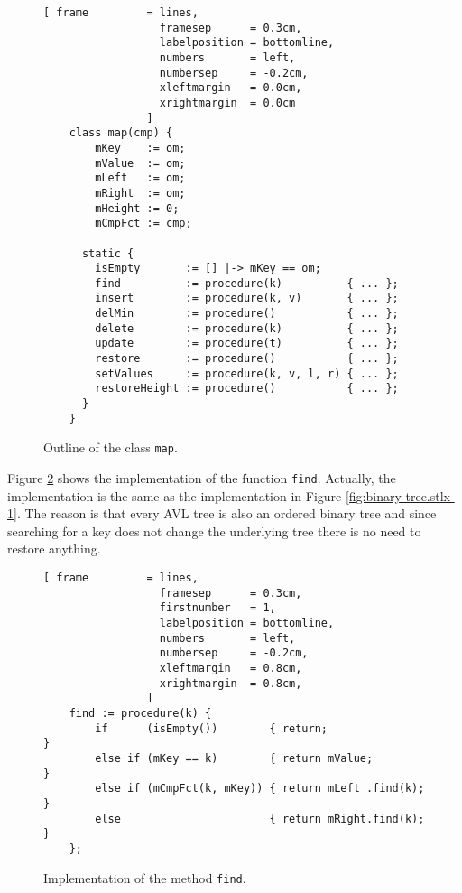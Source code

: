 \begin{figure}[!ht]
  \centering
\begin{Verbatim}[ frame         = lines, 
                  framesep      = 0.3cm, 
                  labelposition = bottomline,
                  numbers       = left,
                  numbersep     = -0.2cm,
                  xleftmargin   = 0.0cm,
                  xrightmargin  = 0.0cm
                ]
    class map(cmp) {
        mKey    := om;
        mValue  := om; 
        mLeft   := om;
        mRight  := om;
        mHeight := 0;
        mCmpFct := cmp;  
    
      static {
        isEmpty       := [] |-> mKey == om;
        find          := procedure(k)          { ... };
        insert        := procedure(k, v)       { ... };
        delMin        := procedure()           { ... };
        delete        := procedure(k)          { ... };
        update        := procedure(t)          { ... };
        restore       := procedure()           { ... };
        setValues     := procedure(k, v, l, r) { ... };
        restoreHeight := procedure()           { ... };
      }
    }
\end{Verbatim}
\vspace*{-0.3cm}
  \caption{Outline of the class \texttt{map}.}
  \label{fig:avl-tree.stlx:outline}
\end{figure}


Figure \ref{fig:avl-tree.stlx:find} shows the implementation of the function \texttt{find}.
Actually, the implementation is the same as the implementation in Figure
\ref{fig:binary-tree.stlx-1}.  The reason is that every AVL tree is also an ordered binary tree and
since searching for a key does not change the underlying tree there is no need to restore anything.

\begin{figure}[!ht]
\centering
\begin{Verbatim}[ frame         = lines, 
                  framesep      = 0.3cm, 
                  firstnumber   = 1,
                  labelposition = bottomline,
                  numbers       = left,
                  numbersep     = -0.2cm,
                  xleftmargin   = 0.8cm,
                  xrightmargin  = 0.8cm,
                ]
    find := procedure(k) {
        if      (isEmpty())        { return;                }
        else if (mKey == k)        { return mValue;         }
        else if (mCmpFct(k, mKey)) { return mLeft .find(k); }
        else                       { return mRight.find(k); }
    };
\end{Verbatim}
\vspace*{-0.3cm}
\caption{Implementation of the method \texttt{find}.}
\label{fig:avl-tree.stlx:find}
\end{figure}


